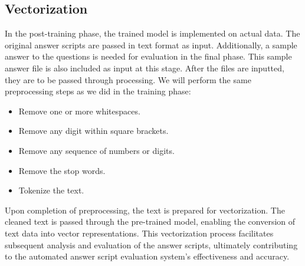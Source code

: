     \subsection{Vectorization}
        \par
        In the post-training phase, the trained model is implemented on actual data. The original answer scripts 
        are passed in text format as input. Additionally, a sample answer to the questions is needed for 
        evaluation in the final phase. This sample answer file is also included as input at this stage. 
        After the files are inputted, they are to be passed through processing. We will perform the same 
        preprocessing steps as we did in the training phase:
        \begin{itemize}
            \item Remove one or more whitespaces.
            \item Remove any digit within square brackets.
            \item Remove any sequence of numbers or digits.
            \item Remove the stop words.
            \item Tokenize the text.
        \end{itemize}
        \par
        Upon completion of preprocessing, the text is prepared for vectorization. The cleaned text is passed 
        through the pre-trained model, enabling the conversion of text data into vector representations. 
        This vectorization process facilitates subsequent analysis and evaluation of the answer scripts, 
        ultimately contributing to the automated answer script evaluation system's effectiveness and accuracy.

